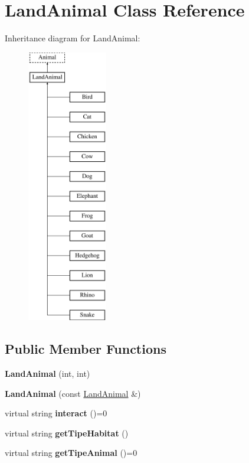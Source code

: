 \hypertarget{classLandAnimal}{\section{Land\-Animal Class Reference}
\label{classLandAnimal}
}
Inheritance diagram for Land\-Animal\-:\begin{figure}[H]
\begin{center}
\leavevmode
\includegraphics[height=12.000000cm]{classLandAnimal}
\end{center}
\end{figure}
\subsection*{Public Member Functions}
\begin{DoxyCompactItemize}
\item 
\hypertarget{classLandAnimal_a93f431da1888f6b8397492c70ff5c465}{{\bfseries Land\-Animal} (int, int)}\label{classLandAnimal_a93f431da1888f6b8397492c70ff5c465}

\item 
\hypertarget{classLandAnimal_a30d3d693ec1a1d7589a75e93c0efcef7}{{\bfseries Land\-Animal} (const \hyperlink{classLandAnimal}{Land\-Animal} \&)}\label{classLandAnimal_a30d3d693ec1a1d7589a75e93c0efcef7}

\item 
\hypertarget{classLandAnimal_a6875179adbd1d991ac0615c7756af61e}{virtual string {\bfseries interact} ()=0}\label{classLandAnimal_a6875179adbd1d991ac0615c7756af61e}

\item 
\hypertarget{classLandAnimal_a8bba1c5493ba6a5618787b2aec0b128b}{virtual string {\bfseries get\-Tipe\-Habitat} ()}\label{classLandAnimal_a8bba1c5493ba6a5618787b2aec0b128b}

\item 
\hypertarget{classLandAnimal_aca2d4efdbfd3a7577d293f3caf9b650d}{virtual string {\bfseries get\-Tipe\-Animal} ()=0}\label{classLandAnimal_aca2d4efdbfd3a7577d293f3caf9b650d}

\end{DoxyCompactItemize}
